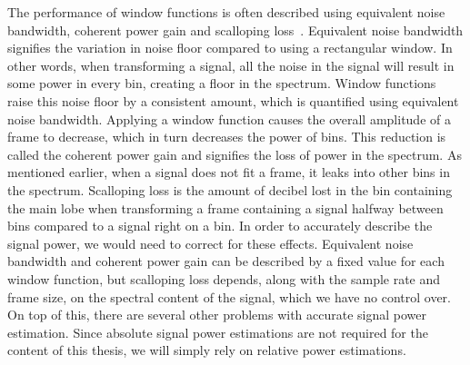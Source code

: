 \documentclass[a4paper,10pt,twocolumn]{article}
\begin{document}
The performance of window functions is often described using equivalent noise bandwidth, coherent power gain and scalloping loss~\cite{windowperf3, windowperf2, windowperf}. Equivalent noise bandwidth signifies the variation in noise floor compared to using a rectangular window. In other words, when transforming a signal, all the noise in the signal will result in some power in every bin, creating a floor in the spectrum. Window functions raise this noise floor by a consistent amount, which is quantified using equivalent noise bandwidth.
%
Applying a window function causes the overall amplitude of a frame to decrease, which in turn decreases the power of bins. This reduction is called the coherent power gain and signifies the loss of power in the spectrum.
%
As mentioned earlier, when a signal does not fit a frame, it leaks into other bins in the spectrum. Scalloping loss is the amount of decibel lost in the bin containing the main lobe when transforming a frame containing a signal halfway between bins compared to a signal right on a bin.
%
In order to accurately describe the signal power, we would need to correct for these effects. Equivalent noise bandwidth and coherent power gain can be described by a fixed value for each window function, but scalloping loss depends, along with the sample rate and frame size, on the spectral content of the signal, which we have no control over. On top of this, there are several other problems with accurate signal power estimation. Since absolute signal power estimations are not required for the content of this thesis, we will simply rely on relative power estimations.
\end{document}
